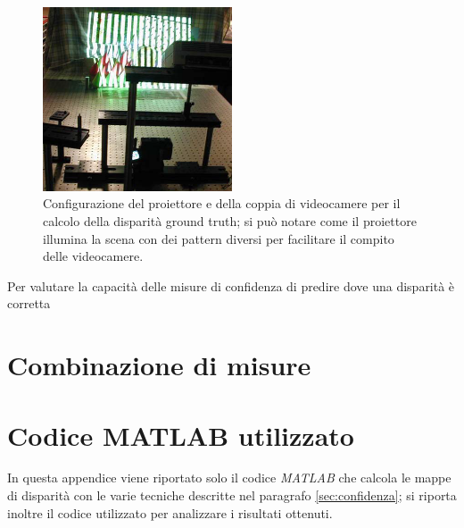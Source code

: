 \documentclass[12pt]{report}
\newcommand{\nullpage}{\newpage\null\thispagestyle{empty}}  %
\begin{document}
		\begin{figure}
			\includegraphics[width=0.5\textwidth]{./figures/ground_truth.png}
			\caption{Configurazione del proiettore e della coppia di videocamere per il calcolo della disparità ground truth; si può notare come il proiettore illumina la scena con dei pattern diversi per facilitare il compito delle videocamere.}
			\label{fig:groundtruth}
		\end{figure}
		
		\noindent Per valutare la capacità delle misure di confidenza di predire dove una disparità è corretta 
				
				
				


	
	\chapter{Combinazione di misure}
	\label{sec:combinazione}
	\pagestyle{fancy}
				

	
	
	
	\nullpage	
	\appendix 
	
	\chapter{Codice MATLAB utilizzato}
	\label{sec:codice}
	
		In questa appendice viene riportato solo il codice \textit{MATLAB} che calcola le mappe di disparità con le varie tecniche descritte nel paragrafo \ref{sec:confidenza}; si riporta inoltre il codice utilizzato per analizzare i risultati ottenuti.
	
\end{document}
